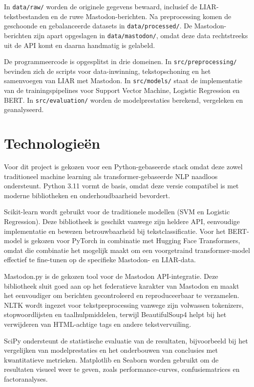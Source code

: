 In \texttt{data/raw/} worden de originele gegevens bewaard, inclusief de LIAR-tekstbestanden en de ruwe Mastodon-berichten. Na preprocessing komen de geschoonde en gebalanceerde datasets in \texttt{data/processed/}. De Mastodon-berichten zijn apart opgeslagen in \texttt{data/mastodon/}, omdat deze data rechtstreeks uit de API komt en daarna handmatig is gelabeld.

De programmeercode is opgesplitst in drie domeinen. In \texttt{src/preprocessing/} bevinden zich de scripts voor data-inwinning, tekstopschoning en het samenvoegen van LIAR met Mastodon. In \texttt{src/models/} staat de implementatie van de trainingspipelines voor Support Vector Machine, Logistic Regression en BERT. In \texttt{src/evaluation/} worden de modelprestaties berekend, vergeleken en geanalyseerd.

\section{Technologieën}

Voor dit project is gekozen voor een Python-gebaseerde stack omdat deze zowel traditioneel machine learning als transformer-gebaseerde NLP naadloos ondersteunt. Python 3.11 vormt de basis, omdat deze versie compatibel is met moderne bibliotheken en onderhoudbaarheid bevordert.

Scikit-learn wordt gebruikt voor de traditionele modellen (SVM en Logistic Regression). Deze bibliotheek is geschikt vanwege zijn heldere API, eenvoudige implementatie en bewezen betrouwbaarheid bij tekstclassificatie. Voor het BERT-model is gekozen voor PyTorch in combinatie met Hugging Face Transformers, omdat die combinatie het mogelijk maakt om een voorgetraind transformer-model effectief te fine-tunen op de specifieke Mastodon- en LIAR-data.

Mastodon.py is de gekozen tool voor de Mastodon API-integratie. Deze bibliotheek sluit goed aan op het federatieve karakter van Mastodon en maakt het eenvoudiger om berichten gecontroleerd en reproduceerbaar te verzamelen. NLTK wordt ingezet voor tekstpreprocessing vanwege zijn volwassen tokenizers, stopwoordlijsten en taalhulpmiddelen, terwijl BeautifulSoup4 helpt bij het verwijderen van HTML-achtige tags en andere tekstvervuiling.

SciPy ondersteunt de statistische evaluatie van de resultaten, bijvoorbeeld bij het vergelijken van modelprestaties en het onderbouwen van conclusies met kwantitatieve metrieken. Matplotlib en Seaborn worden gebruikt om de resultaten visueel weer te geven, zoals performance-curves, confusiematrices en factoranalyses.

